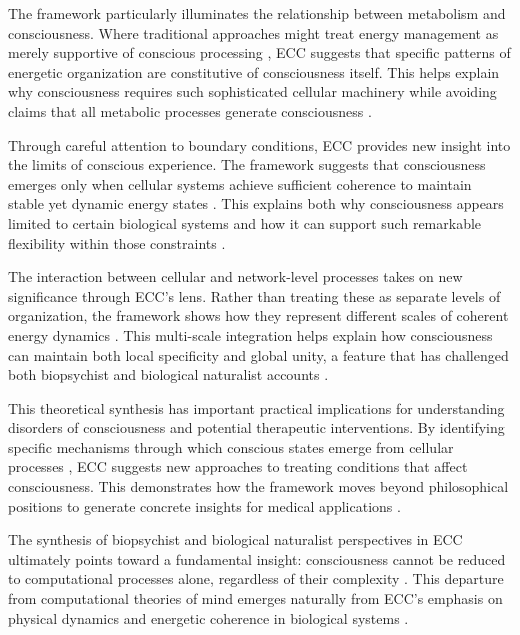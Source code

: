 \begin{refsection}
The framework particularly illuminates the relationship between metabolism and consciousness. Where traditional approaches might treat energy management as merely supportive of conscious processing \cite{searle1992rediscovery}, ECC suggests that specific patterns of energetic organization are constitutive of consciousness itself. This helps explain why consciousness requires such sophisticated cellular machinery while avoiding claims that all metabolic processes generate consciousness \cite{margulis2000life}.

Through careful attention to boundary conditions, ECC provides new insight into the limits of conscious experience. The framework suggests that consciousness emerges only when cellular systems achieve sufficient coherence to maintain stable yet dynamic energy states \cite{varela1997patterns}. This explains both why consciousness appears limited to certain biological systems and how it can support such remarkable flexibility within those constraints \cite{godfrey2016other}.

The interaction between cellular and network-level processes takes on new significance through ECC's lens. Rather than treating these as separate levels of organization, the framework shows how they represent different scales of coherent energy dynamics \cite{lyon2015cognitive}. This multi-scale integration helps explain how consciousness can maintain both local specificity and global unity, a feature that has challenged both biopsychist and biological naturalist accounts \cite{clark2010supersizing}.

This theoretical synthesis has important practical implications for understanding disorders of consciousness and potential therapeutic interventions. By identifying specific mechanisms through which conscious states emerge from cellular processes \cite{deacon2011incomplete}, ECC suggests new approaches to treating conditions that affect consciousness. This demonstrates how the framework moves beyond philosophical positions to generate concrete insights for medical applications \cite{thompson2010mind}.

The synthesis of biopsychist and biological naturalist perspectives in ECC ultimately points toward a fundamental insight: consciousness cannot be reduced to computational processes alone, regardless of their complexity \cite{thompson2010mind}. This departure from computational theories of mind emerges naturally from ECC's emphasis on physical dynamics and energetic coherence in biological systems \cite{searle2017biological}.


\end{refsection}
